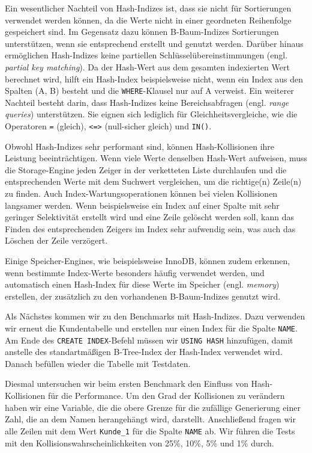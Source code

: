 Ein wesentlicher Nachteil von Hash-Indizes ist, dass sie nicht für Sortierungen verwendet werden können, da die Werte nicht in einer geordneten Reihenfolge gespeichert sind.
Im Gegensatz dazu können B-Baum-Indizes Sortierungen unterstützen, wenn sie entsprechend erstellt und genutzt werden.
Darüber hinaus ermöglichen Hash-Indizes keine partiellen Schlüsselübereinstimmungen (engl. \textit{partial key matching}).
Da der Hash-Wert aus dem gesamten indexierten Wert berechnet wird, hilft ein Hash-Index beispielsweise nicht, wenn ein Index aus den Spalten (A, B) besteht und die \texttt{WHERE}-Klausel nur auf A verweist.
Ein weiterer Nachteil besteht darin, dass Hash-Indizes keine Bereichsabfragen (engl. \textit{range queries}) unterstützen.
Sie eignen sich lediglich für Gleichheitsvergleiche, wie die Operatoren \texttt{=} (gleich), \texttt{<=>} (null-sicher gleich) und \texttt{IN()}.

Obwohl Hash-Indizes sehr performant sind, können Hash-Kollisionen ihre Leistung beeinträchtigen.
Wenn viele Werte denselben Hash-Wert aufweisen, muss die Storage-Engine jeden Zeiger in der verketteten Liste durchlaufen und die entsprechenden Werte mit dem Suchwert vergleichen, um die richtige(n) Zeile(n) zu finden.
Auch Index-Wartungsoperationen können bei vielen Kollisionen langsamer werden.
Wenn beispielsweise ein Index auf einer Spalte mit sehr geringer Selektivität erstellt wird und eine Zeile gelöscht werden soll, kann das Finden des entsprechenden Zeigers im Index sehr aufwendig sein, was auch das Löschen der Zeile verzögert.

Einige Speicher-Engines, wie beispielsweise InnoDB, können zudem erkennen, wenn bestimmte Index-Werte besonders häufig verwendet werden, und automatisch einen Hash-Index für diese Werte im Speicher (engl. \textit{memory}) erstellen, der zusätzlich zu den vorhandenen B-Baum-Indizes genutzt wird.

Als Nächstes kommen wir zu den Benchmarks mit Hash-Indizes.
Dazu verwenden wir erneut die Kundentabelle und erstellen nur einen Index für die Spalte \texttt{NAME}.
Am Ende des \texttt{CREATE INDEX}-Befehl müssen wir \texttt{USING HASH} hinzufügen, damit anstelle des standartmäßigen B-Tree-Index der Hash-Index verwendet wird.
Danach befüllen wieder die Tabelle mit Testdaten.

Diesmal untersuchen wir beim ersten Benchmark den Einfluss von Hash-Kollisionen für die Performance.
Um den Grad der Kollisionen zu verändern haben wir eine Variable, die die obere Grenze für die zufällige Generierung einer Zahl, die an dem Namen herangehängt wird, darstellt.
Anschließend fragen wir alle Zeilen mit dem Wert \texttt{Kunde\_1} für die Spalte \texttt{NAME} ab.
Wir führen die Tests mit den Kollisionswahrscheinlichkeiten von 25\%, 10\%, 5\% und 1\% durch.

